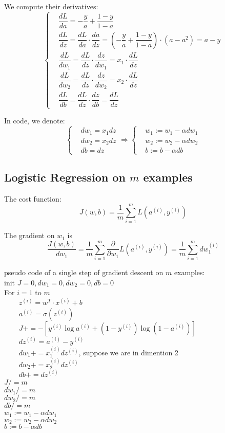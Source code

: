 We compute their derivatives:
$$
\left\{
\begin{aligned}
	& \dfrac{dL}{da} = - \dfrac{y}{a} + \dfrac{1 - y}{1 - a} \\
	& \dfrac{dL}{dz} = \dfrac{dL}{da} \cdot \dfrac{da}{dz} = (- \dfrac{y}{a} + \dfrac{1 - y}{1 - a}) \cdot (a - a^2) = a - y \\
	& \dfrac{dL}{dw_1} = \dfrac{dL}{dz} \cdot \dfrac{dz}{dw_1} = x_1 \cdot \dfrac{dL}{dz} \\
	& \dfrac{dL}{dw_2} = \dfrac{dL}{dz} \cdot \dfrac{dz}{dw_2} = x_2 \cdot \dfrac{dL}{dz} \\
	& \dfrac{dL}{db} = \dfrac{dL}{dz} \cdot \dfrac{dz}{db} = \dfrac{dL}{dz}
\end{aligned}
\right.
$$

In code, we denote:
$$
\left\{
\begin{aligned}
	& dw_1 = x_1 dz \\
	& dw_2 = x_2 dz \\
	& db = dz
\end{aligned}
\right.
\Rightarrow
\left\{
\begin{aligned}
	& w_1 := w_1 - \alpha dw_1 \\
	& w_2 := w_2 - \alpha dw_2 \\
	& b := b - \alpha db
\end{aligned}
\right.
$$

\subsection{Logistic Regression on $m$ examples}
The cost function: $$ J(w, b) = \dfrac{1}{m} \sum_{i = 1}^m L(a^{(i)}, y^{(i)}) $$

The gradient on $w_1$ is $$ \dfrac{J(w, b)}{dw_1} = \dfrac{1}{m} \sum_{i = 1}^m \dfrac{\partial}{\partial w_1} L(a^{(i)}, y^{(i)}) = \dfrac{1}{m} \sum_{i = 1}^m dw^{(i)}_1 $$

pseudo code of a single step of gradient descent on $m$ examples: \\
init $J = 0, dw_1 = 0, dw_2 = 0, db = 0$ \\
For $i = 1$ to $m$ \\
\verb+    + $z^{(i)} = w^T \cdot x^{(i)} + b$ \\
\verb+    + $a^{(i)} = \sigma(z^{(i)})$ \\
\verb+    + $J += -[y^{(i)} \log a^{(i)} + (1 - y^{(i)}) \log (1 - a^{(i)})]$ \\
\verb+    + $dz^{(i)} = a^{(i)} - y^{(i)}$ \\
\verb+    + $dw_1 += x^{(i)}_1 dz^{(i)}$, suppose we are in dimention 2 \\
\verb+    + $dw_2 += x^{(i)}_2 dz^{(i)}$ \\
\verb+    + $db += dz^{(i)}$ \\
$J /= m$ \\
$dw_1 /= m$ \\
$dw_2 /= m$ \\
$db /= m$ \\
$w_1 := w_1 - \alpha dw_1$ \\
$w_2 := w_2 - \alpha dw_2$ \\
$b := b - \alpha db$

